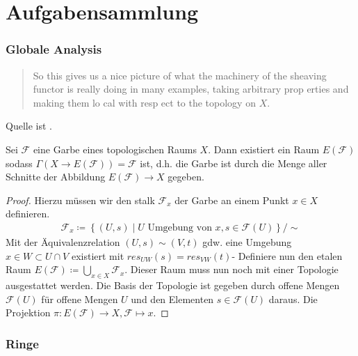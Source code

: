 \documentclass[ngerman, parskip=half, titlepage=false]{scrartcl}
\begin{document}
\part{Aufgabensammlung}

\section{Globale Analysis}

\begin{quote}
	So this gives us a nice picture of what the machinery of the
        sheaving functor is really doing in many examples, taking
        arbitrary prop erties and making them lo cal with resp ect to
        the topology on $ X $.
\end{quote}
Quelle ist \cite[Seite 4]{ramananglobal}.

\begin{Satz}
	Sei $ \mathcal{F} $ eine Garbe eines topologischen
	Raums $ X $. Dann existiert ein Raum $ E(\mathcal{F}) $
	sodass $ \Gamma(X \to E(\mathcal{F})) = \mathcal{F} $ ist, d.h.
	die Garbe ist durch die Menge aller Schnitte der Abbildung
	$ E(\mathcal{F}) \to X $ gegeben.
	\begin{proof}
		Hierzu müssen wir den stalk $ \mathcal{F}_x $ der Garbe
		an einem Punkt $ x\in X $ definieren.
		\begin{gather*}
			\mathcal{F}_x \coloneqq \left\{ (U,s) \middle| U \text{ Umgebung von }x , s\in \mathcal{F}(U)  \right\} / \sim
		\end{gather*}
		Mit der Äquivalenzrelation $ (U,s)\sim (V,t) $ gdw.
		eine Umgebung $x\in W \subset U\cap V $ existiert mit
		$ res_{UW}(s)=res_{VW}(t) $-
		Definiere nun den etalen Raum $ E(\mathcal{F}) \coloneqq \bigcup_{x\in X} \mathcal{F}_x$. Dieser Raum muss nun noch mit einer
		Topologie ausgestattet werden. Die Basis der Topologie
		ist gegeben durch offene Mengen $ \mathcal{F}(U)$ 
		für offene Mengen $ U $ und den Elementen $ s\in \mathcal{F}(U) $ daraus. Die Projektion $ \pi \colon E(\mathcal{F}) \to X , \mathcal{F} \mapsto x $.
	\end{proof}
\end{Satz}

\section{Ringe}
\end{document}

